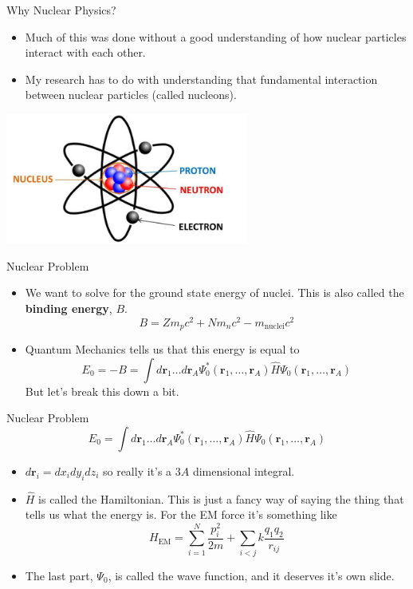 \documentclass{beamer}
\renewcommand{\r}{\mathbf{r}}
\begin{document}
\begin{frame}{Why Nuclear Physics?}
\begin{itemize}
   \item Much of this was done without a good understanding of how nuclear particles interact with each other.
   \item My research has to do with understanding that fundamental interaction between nuclear particles (called nucleons).
\end{itemize}
\begin{center}
   \includegraphics[width=0.6\textwidth]{figures/atom.jpg}
\end{center}
\end{frame}

\begin{frame}{Nuclear Problem}
\begin{itemize}
   \item We want to solve for the ground state energy of nuclei. This is also called the {\bf binding energy}, $B$.
   \begin{equation*}
      B = Zm_pc^2 + Nm_nc^2 - m_\text{nuclei}c^2
   \end{equation*}
   \item<2-> Quantum Mechanics tells us that this energy is equal to
   \begin{equation*}
      E_0 = -B = \int d\r_1\ldots d\r_A \Psi_0^*(\r_1,\ldots,\r_A) \hat{H} \Psi_0(\r_1,\ldots,\r_A)
   \end{equation*}
   But let's break this down a bit.
\end{itemize}
\end{frame}

\begin{frame}{Nuclear Problem}
\begin{equation*}
   E_0 = \int d\r_1\ldots d\r_A \Psi_0^*(\r_1,\ldots,\r_A) \hat{H} \Psi_0(\r_1,\ldots,\r_A)
\end{equation*}
\begin{itemize}
   \item $d\r_i = dx_idy_idz_i$ so really it's a $3A$ dimensional integral.
   \item<2-> $\hat{H}$ is called the Hamiltonian. This is just a fancy way of saying the thing that tells us what the energy is. For the EM force it's something like
   \begin{equation*}
      H_\text{EM} = \sum\limits_{i=1}^N \frac{p_i^2}{2m} + \sum\limits_{i<j} k\frac{q_1q_2}{r_{ij}}
   \end{equation*}
   \item<3-> The last part, $\Psi_0$,  is called the wave function, and it deserves it's own slide.
\end{itemize}
\end{frame}
\end{document}
